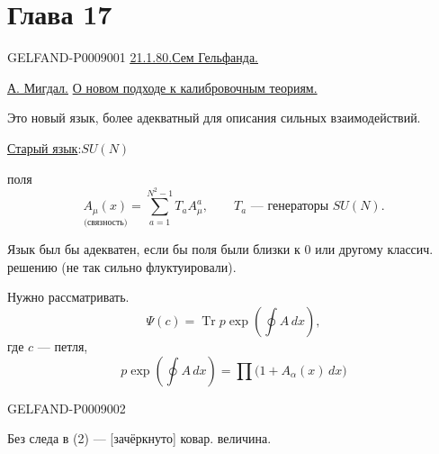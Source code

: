 \section*{Глава 17}
\begin{GelfandAdjacentEvidence}{GELFAND-P000900}{1}
\underline{\underline{21.1.80.}}\qquad\uline{Сем Гельфанда.}

\underline{\underline{А. Мигдал.}}\qquad
\uline{О новом подходе к калибровочным теориям.}

Это новый язык, более адекватный для описания сильных взаимодействий.

\uline{Старый язык}:\quad $SU(N)$

поля
\begin{equation*}
\underset{\text{(связность)}}{A_\mu(x)}
=\sum_{a=1}^{N^2-1} T_a A_\mu^a,\qquad
T_a\text{ — генераторы }SU(N). \tag{1}
\end{equation*}

Язык был бы адекватен, если бы поля были близки к $0$ или другому классич. решению (не так сильно флуктуировали).

Нужно рассматривать.
\begin{equation*}
\Psi(c)=\operatorname{Tr}p\exp\left(\oint A\,dx\right), \tag{2}
\end{equation*}
где $c$ — петля,
\begin{equation*}
p\exp\left(\oint A\,dx\right)=\prod\bigl(1+A_\alpha(x)\,dx\bigr) \tag{3}
\end{equation*}
\end{GelfandAdjacentEvidence}
\begin{GelfandAdjacentEvidence}{GELFAND-P000900}{2}


Без следа в (2) — [зачёркнуто] ковар. величина.
\end{GelfandAdjacentEvidence}
